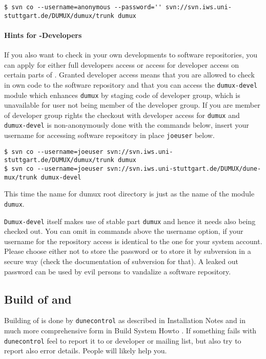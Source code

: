 \begin{lstlisting}[style=Bash]
$ svn co --username=anonymous --password='' svn://svn.iws.uni-stuttgart.de/DUMUX/dumux/trunk dumux
\end{lstlisting}

\paragraph{Hints for \Dumux-Developers}
If you also want to check in your own \Dumux developments to \Dumux software repositories, you can apply for either full developers access or access for developer access on certain parts of \Dumux. Granted developer access means that you are allowed to check in own code to the software repository and that you can access the \texttt{dumux-devel} module which enhances \texttt{dumux} by staging code of developer group, which is unavailable for user not being member of the developer group.
If you are member of developer group rights the checkout with developer access for \texttt{dumux} and \texttt{dumux-devel} is non-anonymously done with the commands below, insert your username
for accessing \Dumux software repository in place \texttt{joeuser} below.

\begin{lstlisting}[style=Bash]
$ svn co --username=joeuser svn://svn.iws.uni-stuttgart.de/DUMUX/dumux/trunk dumux
$ svn co --username=joeuser svn://svn.iws.uni-stuttgart.de/DUMUX/dune-mux/trunk dumux-devel
\end{lstlisting}

This time the name for dumux root directory is just as the name of the module \texttt{dumux}.

\texttt{Dumux-devel} itself makes use of stable part \texttt{dumux} and hence it needs also being checked out. 
You can omit in commands above the username option, if your username for the repository access is identical to the one for your system account.
Please choose either not to store the password or to store it by subversion in a secure way (check the documentation of subversion for that). 
A leaked out password can be used by evil persons to vandalize a software repository.

\subsection{Build of \Dune and \Dumux}
\label{buildIt}
Building of \Dune is done by \texttt{dunecontrol} as described in \Dune Installation Notes \cite{DUNE-INST} and in much more comprehensive form in \Dune Build System Howto \cite{DUNE-BS}.
If something fails with \texttt{dunecontrol} feel to report it to \Dune or \Dumux developer or mailing list, but also try to report also error details. People will likely help you.


